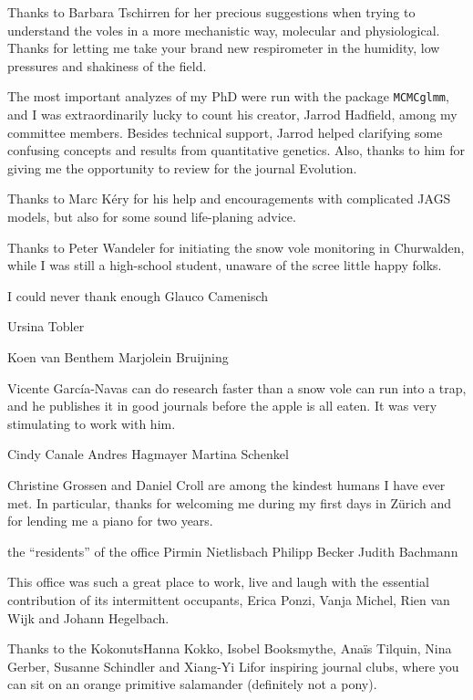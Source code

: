 Thanks to Barbara Tschirren for her precious suggestions when trying to understand the voles in a more mechanistic way, molecular and physiological. Thanks for letting me take your brand new respirometer in the humidity, low pressures and shakiness of the field. 

The most important analyzes of my PhD were run with the package \texttt{MCMCglmm}, and I was extraordinarily lucky to count his creator, Jarrod Hadfield, among my committee members. Besides technical support, Jarrod helped clarifying some confusing concepts and results from quantitative genetics. Also, thanks to him for giving me the opportunity to review for the journal Evolution. 

Thanks to Marc K\'{e}ry for his help and encouragements with complicated JAGS models, but also for some sound life-planing advice. 

Thanks to Peter Wandeler for initiating the snow vole monitoring in Churwalden, while I was still a high-school student, unaware of the scree little happy folks. 

I could never thank enough Glauco Camenisch

Ursina Tobler




Koen van Benthem
Marjolein Bruijning

Vicente Garc\'ia-Navas can do research faster than a snow vole can run into a trap, and he publishes it in good journals before the apple is all eaten. It was very stimulating to work with him. 


Cindy Canale
Andres Hagmayer
Martina Schenkel

Christine Grossen and Daniel Croll are among the kindest humans I have ever met. In particular, thanks for welcoming me during my first days in Z\"urich and for lending me a piano for two years.

the ``residents'' of the office
Pirmin Nietlisbach
Philipp Becker
Judith Bachmann

This office was such a great place to work, live and laugh with the essential contribution of its intermittent occupants,
Erica Ponzi, 
Vanja Michel, 
Rien van Wijk and 
Johann Hegelbach.

Thanks to the Kokonuts\textemdash Hanna Kokko, Isobel Booksmythe, Ana\"is Tilquin, Nina Gerber, Susanne Schindler and Xiang-Yi Li\textemdash for inspiring journal clubs, where you can sit on an orange primitive salamander (definitely not a pony).

